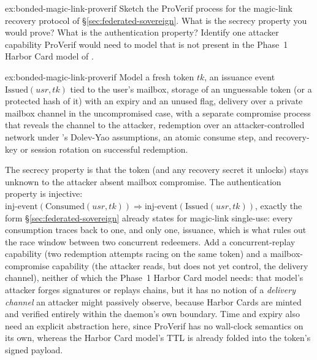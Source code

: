 \documentclass[11pt,a4paper]{article}
\theoremstyle{definition}
\theoremstyle{remark}
\begin{document}
\begin{pdexercise}[kind=Trace,rating=2]{ex:bonded-magic-link-proverif}
Sketch the ProVerif process for the magic-link recovery protocol of \S\ref{sec:federated-sovereign}. What is the secrecy property you would prove? What is the authentication property? Identify one attacker capability ProVerif would need to model that is not present in the Phase~1 Harbor Card model of .
\end{pdexercise}
\begin{pdsolution}{ex:bonded-magic-link-proverif}
Model a fresh token $\mathit{tk}$, an issuance event $\mathrm{Issued}(\mathit{usr},\mathit{tk})$ tied to the user's mailbox, storage of an unguessable token (or a protected hash of it) with an expiry and an unused flag, delivery over a private mailbox channel in the uncompromised case, with a
separate compromise process that reveals the channel to the attacker, redemption over an attacker-controlled network under 's Dolev-Yao assumptions, an atomic consume step, and recovery-key or session rotation on successful redemption.

The secrecy property is that the token (and any recovery secret it unlocks) stays unknown to the attacker absent mailbox compromise. The authentication property is injective: $\mathrm{inj\text{-}event}(\mathrm{Consumed}(\mathit{usr},\mathit{tk})) \Rightarrow \mathrm{inj\text{-}event}(\mathrm{Issued}(\mathit{usr},\mathit{tk}))$, exactly the form \S\ref{sec:federated-sovereign} already states for magic-link single-use: every consumption traces back to one, and only one, issuance, which is what rules out the race window between two concurrent redeemers. Add a concurrent-replay capability (two redemption attempts racing on the same token) and a mailbox-compromise capability (the attacker reads, but does not yet control, the delivery channel), neither of which the Phase~1 Harbor Card model needs: that model's attacker forges signatures or replays chains, but it has no notion of a \emph{delivery channel} an attacker might passively observe, because Harbor Cards are minted and verified entirely within the daemon's own boundary. Time and expiry also need an explicit abstraction here, since ProVerif has no wall-clock semantics on its own, whereas the Harbor Card model's TTL is already folded into the token's signed payload.
\end{pdsolution}

\end{document}
